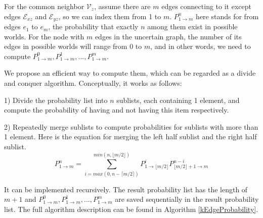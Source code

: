 \documentclass[\main/thesis.tex]{subfiles}
\begin{document}

For the common neighbor $\mathcal{V}_z$, assume there are $m$ edges connecting to it except edges $\mathcal{E}_{xz}$ and $\mathcal{E}_{yz}$, so we can index them from 1 to $m$. $P_{1\rightarrow m}^n$ here stands for from edges $e_1$ to $e_m$, the probability that exactly $n$ among them exist in possible worlds. For the node with $m$ edges in the uncertain graph, the number of its edges in possible worlds will range from 0 to $m$, and in other words, we need to compute $P_{1\rightarrow m}^0, P_{1\rightarrow m}^1, ..., P_{1\rightarrow m}^m$. 

We propose an efficient way to compute them, which can be regarded as a divide and conquer algorithm. Conceptually, it works as follows:

1) Divide the probability list into $n$ sublists, each containing 1 element, and compute the probability of having and not having this item respectively.

2) Repeatedly merge sublists to compute probabilities for sublists with more than 1 element. Here is the equation for merging the left half sublist and the right half sublist.
\begin{equation}
P_{1\rightarrow m}^n=\sum_{i=max(0,n-\lceil m/2 \rceil)}^{min(n,\lfloor m/2 \rfloor)}P_{1\rightarrow{\lfloor m/2 \rfloor}}^i P_{{\lfloor m/2 \rfloor}+1\rightarrow m}^{n-i}
\label{divide-conquer-specific}
\end{equation}

It can be implemented recursively. The result probability list has the length of $m+1$ and $P_{1\rightarrow m}^0, P_{1\rightarrow m}^1, ..., P_{1\rightarrow m}^m$ are saved sequentially in the result probability list. The full algorithm description can be found in Algorithm \ref{kEdgeProbability}.
\end{document}
